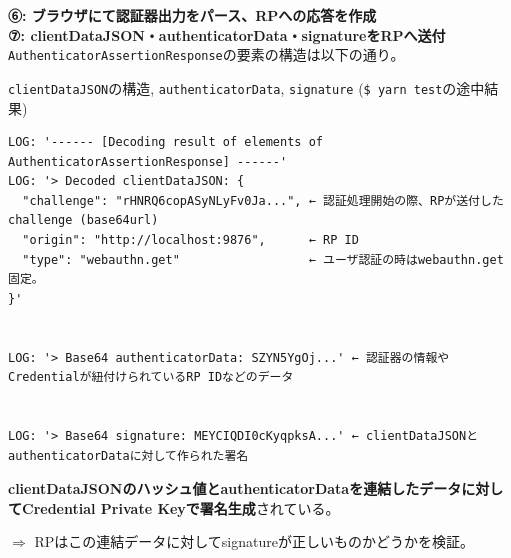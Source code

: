 \documentclass[12pt,dvipdfmx,uplatex]{beamer}
\begin{document}
\begin{frame}[fragile]
\small 
\textbf{⑥: ブラウザにて認証器出力をパース、RPへの応答を作成}\\
\textbf{⑦: \textbf{clientDataJSON}・\textbf{authenticatorData}・\textbf{signature}をRPへ送付}\\[2ex]

\texttt{AuthenticatorAssertionResponse}の要素の構造は以下の通り。

\begin{exampleblock}{\scriptsize \texttt{clientDataJSON}の構造, \texttt{authenticatorData}, \texttt{signature} (\texttt{\$ yarn test}の途中結果)}
\tiny
\begin{verbatim}
LOG: '------ [Decoding result of elements of AuthenticatorAssertionResponse] ------'
LOG: '> Decoded clientDataJSON: {
  "challenge": "rHNRQ6copASyNLyFv0Ja...", ← 認証処理開始の際、RPが送付したchallenge (base64url)
  "origin": "http://localhost:9876",      ← RP ID
  "type": "webauthn.get"                  ← ユーザ認証の時はwebauthn.get固定。
}'


LOG: '> Base64 authenticatorData: SZYN5YgOj...' ← 認証器の情報やCredentialが紐付けられているRP IDなどのデータ


LOG: '> Base64 signature: MEYCIQDI0cKyqpksA...' ← clientDataJSONとauthenticatorDataに対して作られた署名
\end{verbatim}
\end{exampleblock}
\textbf{clientDataJSONのハッシュ値とauthenticatorDataを連結したデータに対してCredential Private Keyで署名生成}されている。

\vspace{1ex}

$\Rightarrow$ RPはこの連結データに対してsignatureが正しいものかどうかを検証。
\end{frame}
\end{document}
